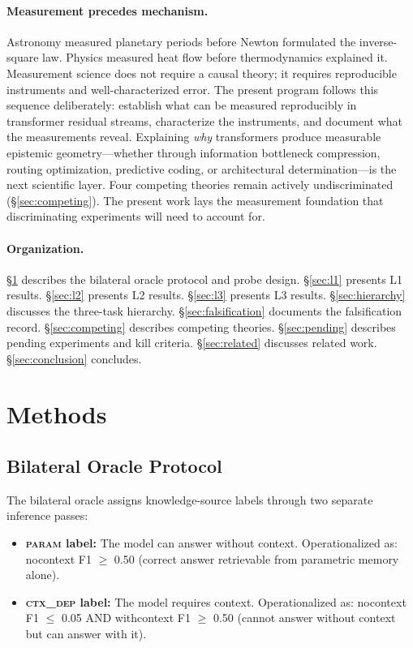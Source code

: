 \documentclass[11pt]{article}
\begin{document}
\paragraph{Measurement precedes mechanism.}
Astronomy measured planetary periods before Newton formulated the inverse-square law.
Physics measured heat flow before thermodynamics explained it. Measurement science
does not require a causal theory; it requires reproducible instruments and
well-characterized error. The present program follows this sequence deliberately:
establish what can be measured reproducibly in transformer residual streams,
characterize the instruments, and document what the measurements reveal. Explaining
\emph{why} transformers produce measurable epistemic geometry---whether through
information bottleneck compression, routing optimization, predictive coding, or
architectural determination---is the next scientific layer. Four competing theories
remain actively undiscriminated (\S\ref{sec:competing}). The present work lays
the measurement foundation that discriminating experiments will need to account for.

\paragraph{Organization.}
\S\ref{sec:methods} describes the bilateral oracle protocol and probe design.
\S\ref{sec:l1} presents L1 results. \S\ref{sec:l2} presents L2 results.
\S\ref{sec:l3} presents L3 results. \S\ref{sec:hierarchy} discusses the three-task
hierarchy. \S\ref{sec:falsification} documents the falsification record.
\S\ref{sec:competing} describes competing theories. \S\ref{sec:pending} describes
pending experiments and kill criteria. \S\ref{sec:related} discusses related work.
\S\ref{sec:conclusion} concludes.

\section{Methods}
\label{sec:methods}

\subsection{Bilateral Oracle Protocol}

The bilateral oracle assigns knowledge-source labels through two separate inference passes:

\begin{itemize}[leftmargin=2em]
\item \textbf{\textsc{param} label:} The model can answer without context. Operationalized
  as: nocontext F1 $\geq$ 0.50 (correct answer retrievable from parametric memory alone).
\item \textbf{\textsc{ctx\_dep} label:} The model requires context. Operationalized as:
  nocontext F1 $\leq$ 0.05 AND withcontext F1 $\geq$ 0.50 (cannot answer without context
  but can answer with it).
\end{itemize}
\end{document}
